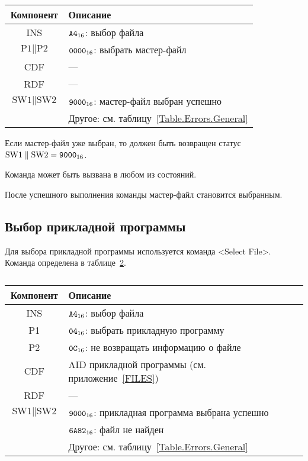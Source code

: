 \begin{table}[hbt]
\caption{}\label{Table.Oper.SelectMFCmd}
\begin{tabular}{|c|p{14cm}|}
\hline
Компонент & Описание \\
\hline
\hline
INS & $\texttt{A4}_{16}$: выбор файла\\ 
\hline
$\text{P1} \parallel \text{P2}$ & $\texttt{0000}_{16}$: выбрать мастер-файл\\
\hline
CDF & --- \\
\hline
\hline 
RDF &  --- \\
\hline
$\text{SW1}\parallel\text{SW2}$ & 
$\texttt{9000}_{16}$: мастер-файл выбран успешно\\
\cline{2-2}
  & Другое: см. таблицу~\ref{Table.Errors.General} \\
\hline
\end{tabular}
\end{table}

Если мастер-файл уже выбран, то должен быть возвращен 
статус $\text{SW1} \parallel \text{SW2} = \texttt{9000}_{16}$.

Команда может быть вызвана в любом из состояний.

После успешного выполнения команды мастер-файл становится выбранным.

\subsection{Выбор прикладной программы}
\label{Oper.Descr.SelectApp}

Для выбора прикладной программы используется команда <Select File>. 
Команда определена в таблице~\ref{Table.Oper.SelectAppCmd}.

\begin{table}[hbt]
\caption{}\label{Table.Oper.SelectAppCmd}
\begin{tabular}{|c|p{14cm}|}
\hline
Компонент & Описание \\
\hline
\hline
INS & $\texttt{A4}_{16}$: выбор файла\\ 
\hline
P1 & $\texttt{04}_{16}$: выбрать прикладную программу\\
\hline
P2 & $\texttt{0C}_{16}$: не возвращать информацию о файле\\
\hline
CDF & AID прикладной программы (см. приложение~\ref{FILES})\\
\hline 
\hline
RDF &  --- \\
\hline
$\text{SW1}\parallel\text{SW2}$ & 
$\texttt{9000}_{16}$: прикладная программа выбрана успешно\\
\cline{2-2}
  & $\texttt{6A82}_{16}$: файл не найден\\
\cline{2-2}
  & Другое: см. таблицу~\ref{Table.Errors.General}\\
\hline
\end{tabular}
\end{table}

